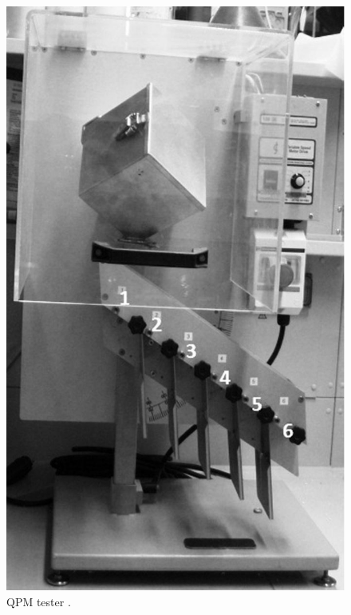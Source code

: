 \begin{figure}[!htb]
\centering
\includegraphics[width=.30\columnwidth]{images/126qpmtester}
\caption[QPM tester]{QPM tester \cite{RefWorks:177}.}
\label{fig:126qpmtester}
\end{figure}